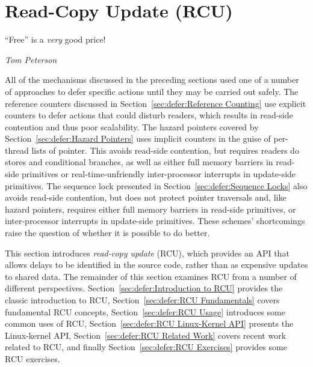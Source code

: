 
\section{Read-Copy Update (RCU)}
\label{sec:defer:Read-Copy Update (RCU)}
%
\epigraph{``Free'' is a \emph{very} good price!}{\emph{Tom Peterson}}

All of the mechanisms discussed in the preceding sections
used one of a number of approaches to defer specific actions
until they may be carried out safely.
The reference counters discussed in
Section~\ref{sec:defer:Reference Counting}
use explicit counters to defer actions that could disturb readers,
which results in read-side contention and thus poor scalability.
The hazard pointers covered by
Section~\ref{sec:defer:Hazard Pointers}
uses implicit counters in the guise of per-thread lists of pointer.
This avoids read-side contention, but requires readers do stores and
conditional branches, as well as either full memory barriers in read-side
primitives or real-time-unfriendly inter-processor interrupts in
update-side primitives.
The sequence lock presented in
Section~\ref{sec:defer:Sequence Locks}
also avoids read-side contention, but does not protect pointer
traversals and, like hazard pointers, requires either full memory barriers
in read-side primitives, or inter-processor interrupts in update-side
primitives.
These schemes' shortcomings raise the question of
whether it is possible to do better.

This section introduces \emph{read-copy update} (RCU), which provides
an API that allows delays to be identified in the source code,
rather than as expensive updates to shared data.
The remainder of this
section examines RCU from a number of different perspectives.
Section~\ref{sec:defer:Introduction to RCU} provides the classic
introduction to RCU,
Section~\ref{sec:defer:RCU Fundamentals} covers fundamental RCU
concepts,
Section~\ref{sec:defer:RCU Usage} introduces some common uses of RCU,
Section~\ref{sec:defer:RCU Linux-Kernel API} presents the Linux-kernel
API,
Section~\ref{sec:defer:RCU Related Work} covers recent work related
to RCU,
and finally
Section~\ref{sec:defer:RCU Exercises} provides some RCU exercises.






